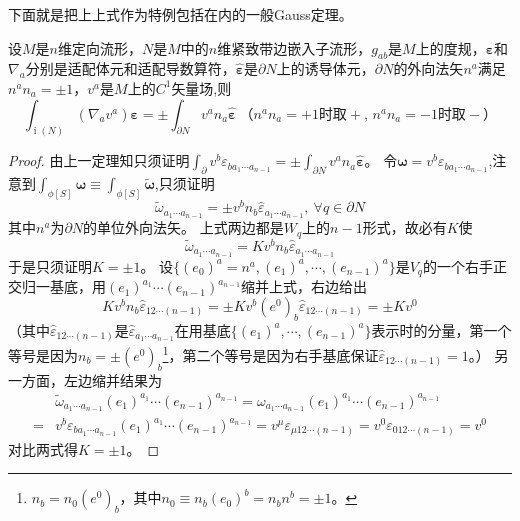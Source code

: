 下面就是把上上式作为特例包括在内的一般Gauss定理。

\begin{theorem}
    设$M$是$n$维定向流形，$N$是$M$中的$n$维紧致带边嵌入子流形，$g_{ab}$是$M$上的度规，$\bm\varepsilon$和$\nabla_a$分别是适配体元和适配导数算符，$\bm{\hat\varepsilon}$是$\partial N$上的诱导体元，$\partial N$的外向法矢$n^a$满足$n^an_a = \pm 1$，$v^a$是$M$上的$C^1$矢量场,则
    $$\int_{\operatorname{i}(N)}(\nabla_av^a)\bm\varepsilon = \pm \int_{\partial N}v^an_a\bm{\hat\varepsilon} ~ \text{（$n^an_a = +1$时取$+$, $n^an_a = -1$时取$-$）}$$
\end{theorem}

\begin{proof}
    由上一定理知只须证明$\displaystyle\int_{\partial}v^b\varepsilon_{ba_1 \cdots a_{n - 1}} = \pm \int_{\partial N}v^an_a\bm{\hat\varepsilon}$。
    令$\bm\omega = v^b\varepsilon_{ba_1 \cdots a_{n - 1}}$,注意到$\displaystyle\int_{\phi[S]}\bm\omega \equiv \int_{\phi[S]}\bm{\tilde\omega}$,只须证明
    $$\tilde\omega_{a_1 \cdots a_{n - 1}} = \pm v^bn_b\hat\varepsilon_{a_1 \cdots a_{n - 1}}, ~ \forall q \in \partial N$$
    其中$n^a$为$\partial N$的单位外向法矢。
    上式两边都是$W_q$上的$n - 1$形式，故必有$K$使
    $$\tilde\omega_{a_1 \cdots a_{n - 1}} = K v^bn_b\hat\varepsilon_{a_1 \cdots a_{n - 1}}$$
    于是只须证明$K = \pm 1$。
    设$\{(e_0)^a = n^a, (e_1)^a, \cdots, (e_{n - 1})^a\}$是$V_q$的一个右手正交归一基底，用$(e_1)^{a_1} \cdots (e_{n - 1})^{a_{n - 1}}$缩并上式，右边给出
    $$Kv^bn_b\hat\varepsilon_{12\cdots(n - 1)} = \pm Kv^b(e^0)_b\hat\varepsilon_{12\cdots(n - 1)} = \pm K v^0$$
    （其中$\hat\varepsilon_{12\cdots(n - 1)}$是$\hat\varepsilon_{a_1 \cdots a_{n - 1}}$在用基底$\{(e_1)^a, \cdots, (e_{n - 1})^a\}$表示时的分量，第一个等号是因为$n_b = \pm(e^0)_b$\footnote{
        $n_b = n_0(e^0)_b$，其中$n_0 \equiv n_b(e_0)^b = n_bn^b = \pm 1$。
    }，第二个等号是因为右手基底保证$\hat\varepsilon_{12\cdots(n - 1)} = 1$。）
    另一方面，左边缩并结果为
    \[\begin{split}
        & \tilde\omega_{a_1 \cdots a_{n - 1}}(e_1)^{a_1} \cdots (e_{n - 1})^{a_{n - 1}} = \omega_{a_1 \cdots a_{n - 1}}(e_1)^{a_1} \cdots (e_{n - 1})^{a_{n - 1}} \\
        = & v^b\varepsilon_{b a_1 \cdots a_{n - 1}}(e_1)^{a_1} \cdots (e_{n - 1})^{a_{n - 1}} = v^\mu\varepsilon_{\mu 1 2 \cdots (n - 1)} = v^0\varepsilon_{0 1 2 \cdots (n - 1)} = v^0
    \end{split}\]
    对比两式得$K = \pm 1$。
\end{proof}

